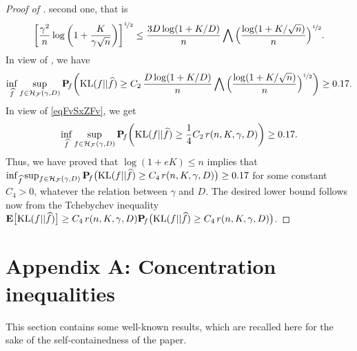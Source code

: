 \begin{proof}[Proof of ]
	second one, that is
	\begin{equation}\label{eqFvSxZFv}
	\bigg[\frac{\gamma^2}{n} \log\bigg(1+\frac{K}{\gamma\sqrt{n}}\bigg)\bigg]^{\nicefrac12}
	\le \frac{ 3 D\log(1+K/D)}{n}\bigwedge 
	\Big(\frac{\log(1+K/\sqrt{n})}{n}\Big)^{\nicefrac12}.
	\end{equation}
	In view of , we have
	\begin{equation}
	\inf_{\widehat f}\sup_{f \in \mathcal H_\mathcal F(\gamma,D)}\mathbf P\!_{f}\bigg({\rm KL}(f||\widehat f)\geq
	C_2\,\frac{ D\log(1+K/D)}{n}\bigwedge 
	\Big(\frac{\log(1+K/\sqrt{n})}{n}\Big)^{\nicefrac12}\bigg)\geq 0.17.
	\end{equation}
	In view of \eqref{eqFvSxZFv}, we get
	\begin{equation}\label{eqFvSxZSx}
	\inf_{\widehat f}\sup_{f \in \mathcal H_\mathcal F(\gamma,D)}\mathbf P\!_{f}\bigg({\rm KL}(f||\widehat f)\geq
	\frac14 C_2\,r(n,K,\gamma,D)\bigg)\geq 0.17.
	\end{equation}
	Thus, we have proved that $\log(1+eK)\le n$ implies that
	$\inf_{\widehat f}\sup_{f \in \mathcal H_\mathcal F(\gamma,D)}\mathbf P\!_{f}\big({\rm KL}(f||\widehat f)\geq
	C_4\,r(n,K,\gamma,D)\big)\geq 0.17$ for some constant $C_4>0$, whatever the relation
	between $\gamma$ and $D$. The desired lower bound follows now from the Tchebychev 
	inequality
	$\mathbf E\big[{\rm KL}(f||\widehat f)\big]\ge C_4\,r(n,K,\gamma,D)
	\mathbf P\!_{f}\big({\rm KL}(f||\widehat f)\geq C_4\,r(n,K,\gamma,D)\big)$.
\end{proof}


\section*{Appendix A: Concentration inequalities} %
\label{sec:appendix_a}

This section contains some well-known results, which are recalled here for the sake of the self-containedness
of the paper.

